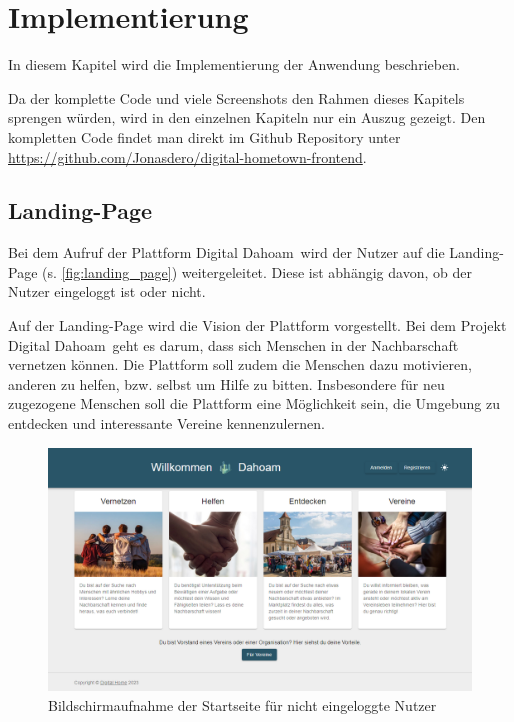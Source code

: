 \chapter{Implementierung}
\label{ch:implementation}

In diesem Kapitel wird die Implementierung der Anwendung beschrieben.

Da der komplette Code und viele Screenshots den Rahmen dieses Kapitels sprengen würden, wird in den einzelnen Kapiteln nur ein Auszug gezeigt.
Den kompletten Code findet man direkt im Github Repository unter \url{https://github.com/Jonasdero/digital-hometown-frontend}.


\section{Landing-Page}
\label{sec:landing_page}

Bei dem Aufruf der Plattform \glqq Digital Dahoam\grqq \ wird der Nutzer auf die Landing-Page (s. \autoref{fig:landing_page}) weitergeleitet. Diese ist abhängig davon, ob der Nutzer eingeloggt ist oder nicht.

Auf der Landing-Page wird die Vision der Plattform vorgestellt. Bei dem Projekt \glqq Digital Dahoam\grqq \ geht es darum, dass sich Menschen in der Nachbarschaft vernetzen können. Die Plattform soll zudem die Menschen dazu motivieren, anderen zu helfen, bzw. selbst um Hilfe zu bitten. Insbesondere für neu zugezogene Menschen soll die Plattform eine Möglichkeit sein, die Umgebung zu entdecken und interessante Vereine kennenzulernen.

\begin{figure}[!htb]
  \centering
  \includegraphics[width=.9\textwidth]{figures/boas/21_landing_page.png}
  \caption[]{Bildschirmaufnahme der Startseite für nicht eingeloggte Nutzer}
  \label{fig:landing_page}
\end{figure}


